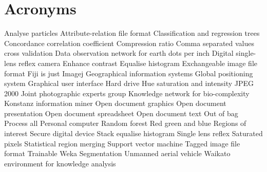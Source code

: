 \begingroup 


    \chapter{Acronyms}\label{sec:acronyms}
    \begin{acronym}[DataONE] %
	{ Analyse particles   }
	{ Attribute-relation file format  }
	{ Classification and regression trees }
	{ Concordance correlation coefficient  }
	{ Compression ratio   }
	{ Comma separated values  }
	{ cross validation   }
	{ Data observation network for earth}
	{ dots per inch  }
	{ Digital single-lens reflex camera }
	{ Enhance contrast   }
	{ Equalise histogram   }
	{ Exchangeable image file format }
	{ Fiji is just Imagej }
	{ Geographical information systems  }
	{ Global positioning system  }
	{ Graphical user interface  }
	{ Hard drive   }
	{ Hue saturation and intensity}
	{ JPEG 2000   }
	{ Joint photographic experts group }
	{ Knowledge network for bio-complexity }
	{ Konstanz information miner  }
	{ Open document graphics  }
	{ Open document presentation  }
	{ Open document spreadsheet  }
	{ Open document text  }
	{ Out of bag    }
	{ Process all   }
	{ Personal computer   }
	{ Random forest   }
	{ Red  green and blue}
	{ Regions of interest  }
	{ Secure digital device  }
	{ Stack equalise histogram  }
	{ Single lens reflex  }
	{ Saturated pixels   }
	{ Statistical region merging  }
	{ Support vector machine  }
	{ Tagged image file format }
	{ Trainable Weka Segmentation  }
	{ Unmanned aerial vehicle  }
	{ Waikato environment for knowledge analysis}
\end{acronym}
\endgroup

